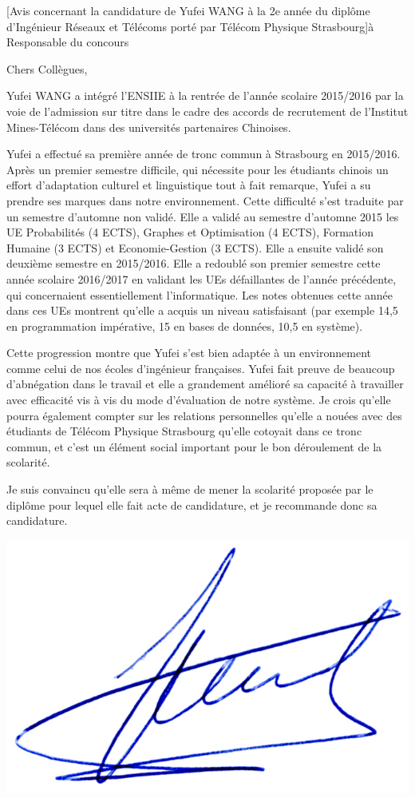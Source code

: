 \documentclass[a4paper,10pt]{article}
\begin{document}

\begin{letter}[Avis concernant la candidature de Yufei WANG à la 2e année du
  diplôme d'Ingénieur Réseaux et Télécoms porté par Télécom Physique Strasbourg]{à}%
{Responsable du concours}

Chers Collègues,

Yufei WANG a intégré l'ENSIIE à la  rentrée de l'année scolaire 2015/2016 par la
voie  de l'admission  sur titre  dans  le cadre  des accords  de recrutement  de
l'Institut Mines-Télécom dans des universités partenaires Chinoises.

Yufei  a   effectué  sa  première  année   de  tronc  commun  à   Strasbourg  en
2015/2016. Après un premier semestre difficile, qui nécessite pour les étudiants
chinois un  effort d'adaptation culturel  et linguistique tout à  fait remarque,
Yufei a su prendre ses marques  dans notre environnement. Cette difficulté s'est
traduite  par un  semestre  d'automne non  validé.  Elle  a  validé au  semestre
d'automne 2015 les  UE Probabilités (4 ECTS), Graphes et  Optimisation (4 ECTS),
Formation Humaine (3 ECTS) et Economie-Gestion (3 ECTS). Elle a ensuite validé
son deuxième semestre en 2015/2016. Elle a redoublé son premier semestre cette
année scolaire 2016/2017 en validant les UEs défaillantes de l'année précédente,
qui concernaient essentiellement l'informatique. Les notes obtenues cette année
dans ces UEs montrent qu'elle a acquis un niveau satisfaisant (par exemple 14,5
en programmation impérative, 15 en bases de données, 10,5 en système).

Cette progression montre  que Yufei s'est bien adaptée à  un environnement comme
celui  de nos  écoles  d'ingénieur  françaises. Yufei  fait  preuve de  beaucoup
d'abnégation  dans le  travail  et  elle a  grandement  amélioré  sa capacité  à
travailler avec efficacité  vis à vis du mode d'évaluation  de notre système. Je
crois  qu'elle  pourra   également compter   sur  les  relations
personnelles  qu'elle a  nouées avec des étudiants de Télécom Physique Strasbourg
qu'elle cotoyait dans ce tronc commun, et c'est un élément social important pour
le bon déroulement de la scolarité. 

Je suis convaincu qu'elle sera à même de mener la scolarité proposée par le diplôme
pour lequel elle fait acte de candidature, et je recommande donc sa candidature.



\end{letter}
\begin{flushright}
\includegraphics[width=.2\textwidth]{signgenaud.jpg}
\end{flushright}
\end{document}
